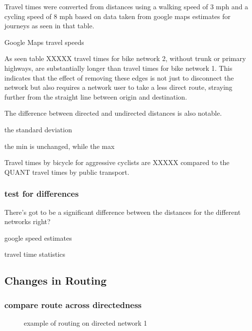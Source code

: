 Travel times were converted from distances using a walking speed of 3 mph and a cycling speed of 8 mph based on data taken from google maps estimates for journeys as seen in that table. 

\begin{table}
\centering
\caption{Google Maps travel speeds}
\label{table:travel_speeds}
\end{table}

As seen table XXXXX travel times for bike network 2, without trunk or primary highways, are substantially longer than travel times for bike network 1. This indicates that the effect of removing these edges is not just to disconnect the network but also requires a network user to take a less direct route, straying further from the straight line between origin and destination. 

The difference between directed and undirected distances is also notable. 

the standard deviation 

the min is unchanged, while the max 

Travel times by bicycle for aggressive cyclists are XXXXX compared to the QUANT travel times by public transport. 

\subsubsection{test for differences}

There's got to be a significant difference between the distances for the different networks right?


\begin{table}
\centering
\caption{google speed estimates}
\label{table:google_speeds}
\end{table}


\begin{table}
\centering
\caption{travel time statistics}
\label{table:travel_time_stats}
\end{table}

\subsection{Changes in Routing}


\subsubsection{compare route across directedness}
\begin{figure}
\centering
\caption{example of routing on directed network 1}
\label{fig:routing_1}
\end{figure}

